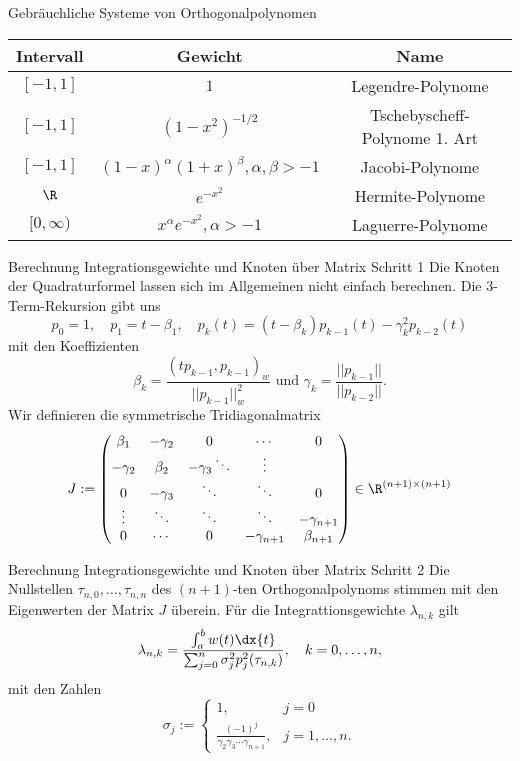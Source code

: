 \begin{karte}{Gebräuchliche Systeme von Orthogonalpolynomen}
    \begin{center}
    \begin{tabular}{c|c|c}
        Intervall & Gewicht & Name \\\hline
        \( [-1,1] \) & \(1\) & Legendre-Polynome\\[5pt]
        \( [-1,1] \) & \( (1-x^2)^{-1/2} \) & Tschebyscheff-Polynome 1. Art \\[5pt]
        \( [-1,1] \) & \( (1-x)^\alpha (1+x)^\beta, \alpha, \beta > -1 \) & Jacobi-Polynome \\[5pt]
        \( \R \) & \( e^{-x^2} \) & Hermite-Polynome \\[5pt]
        \( [0,\infty) \) & \( x^\alpha e^{-x^2}, \alpha > -1 \) & Laguerre-Polynome
    \end{tabular}
    \end{center}
\end{karte}

\begin{karte}{Berechnung Integrationsgewichte und Knoten über Matrix Schritt 1}
    Die Knoten der Quadraturformel lassen sich im Allgemeinen nicht einfach berechnen. 
    Die 3-Term-Rekursion gibt uns 
    \[ p_0 = 1, \quad p_1 = t - \beta_1, \quad p_k(t) = (t - \beta_k)p_{k-1}(t) - \gamma_k^2 p_{k-2}(t) \]
    mit den Koeffizienten 
    \[ \beta_k = \frac{(tp_{k-1}, p_{k-1})_w}{|| p_{k-1} ||_w^2} \text{ und } \gamma_k = \frac{||p_{k-1}||}{||p_{k-2}||}. \]
    Wir definieren die symmetrische Tridiagonalmatrix 
    \[ J := \begin{pmatrix}
        \beta_1 & -\gamma_2 & 0 & \cdots & 0 \\
        -\gamma_2 & \beta_2 & -\gamma_3 \ddots & \vdots \\
        0 & -\gamma_3 & \ddots & \ddots & 0 \\
        \vdots & \ddots & \ddots & \ddots & -\gamma_{n+1} \\
        0 & \cdots & 0 & -\gamma_{n+1} & \beta_{n+1}
    \end{pmatrix} \in \R^{(n+1)\times(n+1)} \]
\end{karte}

\begin{karte}{Berechnung Integrationsgewichte und Knoten über Matrix Schritt 2}
    Die Nullstellen \( \tau_{n,0}, \ldots, \tau_{n,n} \) des \( (n+1) \)-ten Orthogonalpolynoms 
    stimmen mit den Eigenwerten der Matrix \(J\) überein. Für die Integrattionsgewichte \( \lambda_{n,k} \) gilt 
    \[ \lambda_{n,k} = \frac{ \int_a^b w(t) \dx{t} }{ \sum_{j=0}^n \sigma_j^2 p_j^2(\tau_{n,k}) }, \quad k = 0,\ldots, n, \]
    mit den Zahlen 
    \[ \sigma_j := \begin{cases}
        1, & j = 0\\
        \frac{(-1)^j}{ \gamma_2 \gamma_3 \cdots \gamma_{n+1} }, & j = 1,\ldots, n.
    \end{cases} \]
\end{karte}

